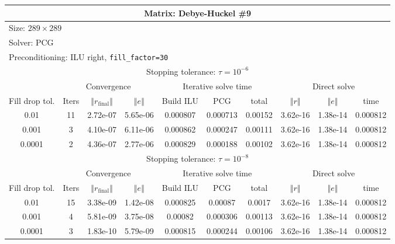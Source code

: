 \documentclass[oneside,final]{amsart}  %
\begin{document}
\begin{tabular}{|c|c|c|c|c|c|c|c|c|c|}
\hline
\multicolumn{10}{|c|}{Matrix: Debye-Huckel \#9}\tabularnewline
\hline
\multicolumn{10}{|l|}{Size: $289\times289$}\tabularnewline
\hline
\multicolumn{10}{|l|}{Solver: PCG}\tabularnewline
\hline
\multicolumn{10}{|l|}{Preconditioning: ILU right, \texttt{fill\_factor=30}}\tabularnewline
\hline
\hline
\multicolumn{10}{|c|}{Stopping tolerance: $\tau=10^{-6}$}\tabularnewline
\hline
\hline
 & \multicolumn{3}{c|}{Convergence} & \multicolumn{3}{c|}{Iterative solve time} & \multicolumn{3}{c|}{Direct solve}\tabularnewline
\hline
Fill drop tol.  & Iters & $\left\Vert r_{\text{final}}\right\Vert $  & $\left\Vert e\right\Vert $  & Build ILU  & PCG  & total  & $\left\Vert r\right\Vert $ & $\left\Vert e\right\Vert $  & time\tabularnewline
\hline
  0.01 & 11 & 2.72e-07 & 5.65e-06 &   0.000807 &   0.000713 &    0.00152 & 3.62e-16 & 1.38e-14 &   0.000812\\
  \hline
  0.001 & 3 & 4.10e-07 & 6.11e-06 &   0.000862 &   0.000247 &    0.00111 & 3.62e-16 & 1.38e-14 &   0.000812\\
  \hline
  0.0001 & 2 & 4.36e-07 & 2.77e-06 &   0.000829 &   0.000188 &    0.00102 & 3.62e-16 & 1.38e-14 &   0.000812\\
  \hline
\hline
\multicolumn{10}{|c|}{Stopping tolerance: $\tau=10^{-8}$}\tabularnewline
\hline
\hline
 & \multicolumn{3}{c|}{Convergence} & \multicolumn{3}{c|}{Iterative solve time} & \multicolumn{3}{c|}{Direct solve }\tabularnewline
\hline
Fill drop tol.  & Iters  & $\left\Vert r_{\text{final}}\right\Vert $  & $\left\Vert e\right\Vert $ & Build ILU  & PCG  & total  & $\left\Vert r\right\Vert $  & $\left\Vert e\right\Vert $  & time\tabularnewline
\hline
  0.01 & 15 & 3.38e-09 & 1.42e-08 &   0.000825 &    0.00087 &     0.0017 & 3.62e-16 & 1.38e-14 &   0.000812\\
  \hline
  0.001 & 4 & 5.81e-09 & 3.75e-08 &    0.00082 &   0.000306 &    0.00113 & 3.62e-16 & 1.38e-14 &   0.000812\\
  \hline
  0.0001 & 3 & 1.83e-10 & 5.79e-09 &   0.000815 &   0.000244 &    0.00106 & 3.62e-16 & 1.38e-14 &   0.000812\\
  \hline
\end{tabular}
\end{document}
